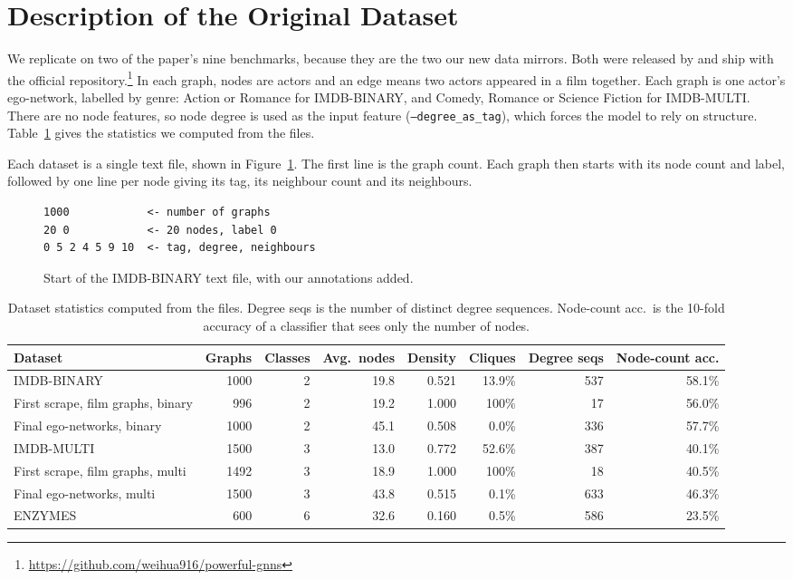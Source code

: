 \documentclass[11pt]{article}
\begin{document}
\section{Description of the Original Dataset}
\label{sec:data}

We replicate on two of the paper's nine benchmarks, because they are the two our new data mirrors. Both were released by \citet{yanardag2015deep} and ship with the official repository.\footnote{\url{https://github.com/weihua916/powerful-gnns}} In each graph, nodes are actors and an edge means two actors appeared in a film together. Each graph is one actor's ego-network, labelled by genre: Action or Romance for IMDB-BINARY, and Comedy, Romance or Science Fiction for IMDB-MULTI. There are no node features, so node degree is used as the input feature (\texttt{--degree\_as\_tag}), which forces the model to rely on structure. Table~\ref{tab:stats} gives the statistics we computed from the files.

Each dataset is a single text file, shown in Figure~\ref{fig:snippet}. The first line is the graph count. Each graph then starts with its node count and label, followed by one line per node giving its tag, its neighbour count and its neighbours.

\begin{figure}[t]
\scriptsize
\begin{verbatim}
1000            <- number of graphs
20 0            <- 20 nodes, label 0
0 5 2 4 5 9 10  <- tag, degree, neighbours
\end{verbatim}
\caption{Start of the IMDB-BINARY text file, with our annotations added.}
\label{fig:snippet}
\end{figure}

\begin{table}[t]
\centering
\small
\setlength{\tabcolsep}{4.5pt}
\begin{tabular}{lrrrrrrr}
\toprule
Dataset & Graphs & Classes & Avg.\ nodes & Density & Cliques & Degree seqs & Node-count acc. \\
\midrule
IMDB-BINARY & 1000 & 2 & 19.8 & 0.521 & 13.9\% & 537 & 58.1\% \\
First scrape, film graphs, binary & 996 & 2 & 19.2 & 1.000 & 100\% & 17 & 56.0\% \\
Final ego-networks, binary & 1000 & 2 & 45.1 & 0.508 & 0.0\% & 336 & 57.7\% \\
\midrule
IMDB-MULTI & 1500 & 3 & 13.0 & 0.772 & 52.6\% & 387 & 40.1\% \\
First scrape, film graphs, multi & 1492 & 3 & 18.9 & 1.000 & 100\% & 18 & 40.5\% \\
Final ego-networks, multi & 1500 & 3 & 43.8 & 0.515 & 0.1\% & 633 & 46.3\% \\
\midrule
ENZYMES & 600 & 6 & 32.6 & 0.160 & 0.5\% & 586 & 23.5\% \\
\bottomrule
\end{tabular}
\caption{Dataset statistics computed from the files. Degree seqs is the number of distinct degree sequences. Node-count acc.\ is the 10-fold accuracy of a classifier that sees only the number of nodes.}
\label{tab:stats}
\end{table}
\end{document}
